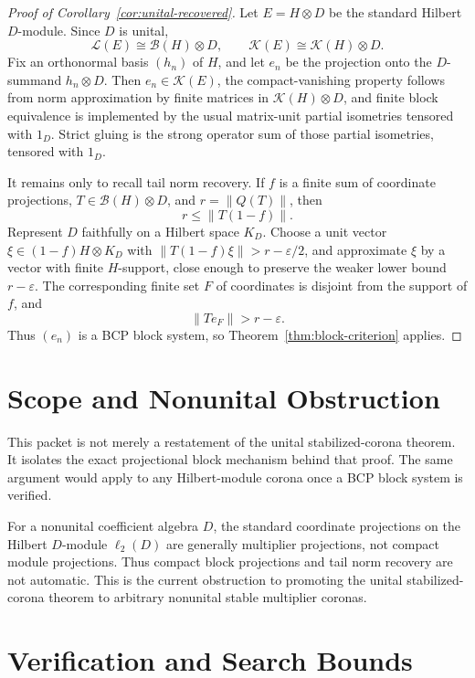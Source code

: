 \documentclass[11pt]{article}
\newcommand{\Lcal}{\mathcal L}
\newcommand{\Kcal}{\mathcal K}
\newcommand{\B}{\mathcal B}
\newcommand{\K}{\mathcal K}
\begin{document}
\begin{proof}[Proof of Corollary~\ref{cor:unital-recovered}]
Let \(E=H\otimes D\) be the standard Hilbert \(D\)-module.  Since \(D\) is
unital,
\[
        \Lcal(E)\cong \B(H)\otimes D,\qquad
        \Kcal(E)\cong \K(H)\otimes D.
\]
Fix an orthonormal basis \((h_n)\) of \(H\), and let \(e_n\) be the projection
onto the \(D\)-summand \(h_n\otimes D\).  Then \(e_n\in\Kcal(E)\), the
compact-vanishing property follows from norm approximation by finite matrices
in \(\K(H)\otimes D\), and finite block equivalence is implemented by the
usual matrix-unit partial isometries tensored with \(1_D\).  Strict gluing is
the strong operator sum of those partial isometries, tensored with \(1_D\).

It remains only to recall tail norm recovery.  If \(f\) is a finite sum of
coordinate projections, \(T\in \B(H)\otimes D\), and \(r=\|Q(T)\|\), then
\[
        r\le \|T(1-f)\|.
\]
Represent \(D\) faithfully on a Hilbert space \(K_D\).  Choose a unit vector
\(\xi\in(1-f)H\otimes K_D\) with \(\|T(1-f)\xi\|>r-\varepsilon/2\), and
approximate \(\xi\) by a vector with finite \(H\)-support, close enough to
preserve the weaker lower bound \(r-\varepsilon\).  The corresponding finite
set \(F\) of coordinates is disjoint from the support of \(f\), and
\[
        \|T e_F\|>r-\varepsilon.
\]
Thus \((e_n)\) is a BCP block system, so Theorem~\ref{thm:block-criterion}
applies.
\end{proof}

\section*{Scope and Nonunital Obstruction}

This packet is not merely a restatement of the unital stabilized-corona
theorem.  It isolates the exact projectional block mechanism behind that
proof.  The same argument would apply to any Hilbert-module corona once a BCP
block system is verified.

For a nonunital coefficient algebra \(D\), the standard coordinate projections
on the Hilbert \(D\)-module \(\ell_2(D)\) are generally multiplier projections,
not compact module projections.  Thus compact block projections and tail norm
recovery are not automatic.  This is the current obstruction to promoting the
unital stabilized-corona theorem to arbitrary nonunital stable multiplier
coronas.

\section*{Verification and Search Bounds}
\end{document}
